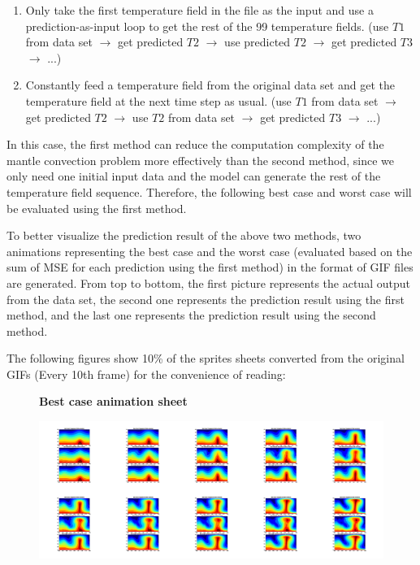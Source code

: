 \begin{enumerate}
  \item Only take the first temperature field in the file as the input and use a prediction-as-input loop to get the rest of the 99 temperature fields. (use $T1$ from data set $\rightarrow$ get predicted $T2$ $\rightarrow$ use predicted $T2$ $\rightarrow$ get predicted $T3$ $\rightarrow$ ...)
  \item Constantly feed a temperature field from the original data set and get the temperature field at the next time step as usual. (use $T1$ from data set $\rightarrow$ get predicted $T2$ $\rightarrow$ use $T2$ from data set $\rightarrow$ get predicted $T3$ $\rightarrow$ ...)
\end{enumerate}

In this case, the first method can reduce the computation complexity of the mantle convection problem more effectively than the second method, since we only need one initial input data and the model can generate the rest of the temperature field sequence. Therefore, the following best case and worst case will be evaluated using the first method.

To better visualize the prediction result of the above two methods, two animations representing the best case and the worst case (evaluated based on the sum of MSE for each prediction using the first method) in the format of GIF files are generated. From top to bottom, the first picture represents the actual output from the data set, the second one represents the prediction result using the first method, and the last one represents the prediction result using the second method.

The following figures show 10\% of the sprites sheets converted from the original GIFs (Every 10th frame) for the convenience of reading:

\begin{figure}[H]
    \centering
    \textbf{Best case animation sheet}\par\medskip
    \includegraphics[scale=0.10]{Report LaTeX/figures/mantle_convection_images/Best_case_GIF_sheet_FNN.png}
\end{figure}

